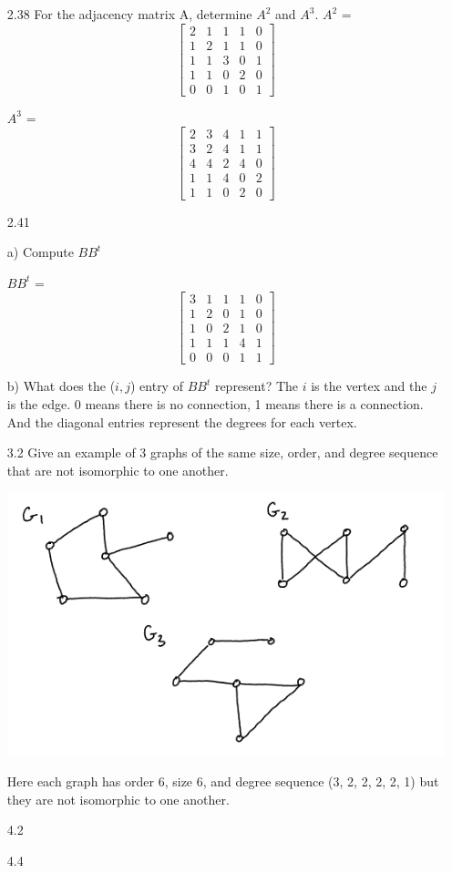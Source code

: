 \documentclass[12pt]{article}
\begin{document}
\begin{enumerate}
\item[2.38] For the adjacency matrix A, determine $A^2$ and $A^3$.
\newline
$A^2$ =
\[
\begin{bmatrix}
2 & 1 & 1 & 1 & 0 \\
1 & 2 & 1 & 1 & 0  \\
1 & 1 & 3 & 0 & 1 \\
1 & 1 & 0 & 2 & 0  \\ 
0 & 0 & 1 & 0 & 1
\end{bmatrix}
\]

$A^3$ =
\[
\begin{bmatrix}
2 & 3 & 4 & 1 & 1 \\
3 & 2 & 4 & 1 & 1  \\
4 & 4 & 2 & 4 & 0 \\
1 & 1 & 4 & 0 & 2  \\ 
1 & 1 & 0 & 2 & 0
\end{bmatrix}
\]
 
\item[2.41] 
\item[] a) Compute $BB^t$
\item[] $BB^t$ =
\[
\begin{bmatrix}
3 & 1 & 1 & 1 & 0 \\
1 & 2 & 0 & 1 & 0  \\
1 & 0 & 2 & 1 & 0 \\
1 & 1 & 1 & 4 & 1  \\ 
0 & 0 & 0 & 1 & 1
\end{bmatrix}
\]
\item[] b) What does the ($i, j$) entry of $BB^t$ represent?
\newline
The $i$ is the vertex and the $j$ is the edge. 0 means there is no connection, 1 means there is a connection. 
And the diagonal entries represent the degrees for each vertex.

\item[3.2] Give an example of 3 graphs of the same size, order, and degree sequence that are not isomorphic to one another.
\newline
\begin{center}
\includegraphics{graph.png}
\end{center}
Here each graph has order 6, size 6, and degree sequence (3, 2, 2, 2, 2, 1) but they are not isomorphic to one another.

\item[4.2] 
\item[] 
\item[4.4] 

\end{enumerate}
\end{document}
